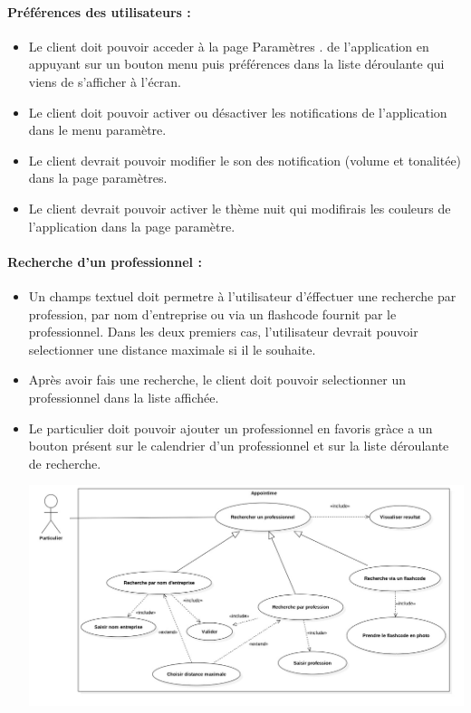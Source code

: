 \documentclass{article}
\begin{document}
\paragraph{Préférences des utilisateurs :}
\begin{itemize}
\item Le client doit pouvoir acceder à la page \og Paramètres \fg{}. de l'application en
  appuyant sur un bouton \og menu \fg{} puis \og préférences \fg{}
  dans la liste déroulante qui viens de s'afficher à l'écran.
\item Le client doit pouvoir activer ou désactiver les notifications
  de l'application dans le menu paramètre.
\item Le client devrait pouvoir modifier le son des notification
  (volume et tonalitée) dans la page paramètres.
\item Le client devrait pouvoir activer le thème nuit qui modifirais les
  couleurs de l'application dans la page paramètre. 
\end{itemize}
\paragraph{Recherche d'un professionnel :}
\begin{itemize}
\item Un champs textuel doit permetre à l'utilisateur d'éffectuer une
  recherche par profession, par nom
  d'entreprise ou via un flashcode fournit par le professionnel. Dans
  les deux premiers cas, l'utilisateur devrait pouvoir selectionner
  une distance maximale si il le souhaite.
\item Après avoir fais une recherche, le client doit pouvoir selectionner un
  professionnel dans la liste affichée.
\item Le particulier doit pouvoir ajouter un professionnel en favoris gràce
  a un bouton présent sur le calendrier d'un professionnel et sur la
  liste déroulante de recherche. 

\includegraphics[scale=0.3]{ShematDiagrammes/useCaseRecherchePro.jpg}

\end{itemize}
\end{document}
